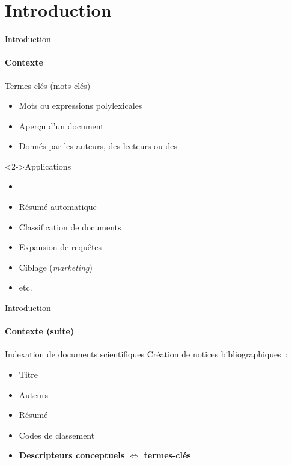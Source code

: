 \section*{Introduction}
  \begin{frame}{Introduction}
    \framesubtitle{Contexte}

    \begin{block}{Termes-clés (mots-clés)}
      \begin{itemize}
        \item{Mots ou expressions polylexicales}
        \item{Aperçu d'un document}
        \item{Donnés par les auteurs, des lecteurs ou des }
      \end{itemize}
    \end{block}

    \begin{block}<2->{Applications}
      \begin{minipage}{.5\linewidth}
        \begin{itemize}
          \item{}
          \item{Résumé automatique}
          \item{Classification de documents}
        \end{itemize}
      \end{minipage}\hfill
      \begin{minipage}{.48\linewidth}
        \begin{itemize}
          \item{Expansion de requêtes}
          \item{Ciblage (\textit{marketing})}
          \item{etc.}
        \end{itemize}
      \end{minipage}
    \end{block}
  \end{frame}

  \begin{frame}{Introduction}
    \framesubtitle{Contexte (suite)}

    \begin{block}{Indexation de documents scientifiques}
      Création de notices bibliographiques~:
      \begin{itemize}
        \item{Titre}
        \item{Auteurs}
        \item{Résumé}
        \item{Codes de classement}
        \item{\textbf{Descripteurs conceptuels $\Leftrightarrow$ termes-clés}}
      \end{itemize}
    \end{block}
  \end{frame}

